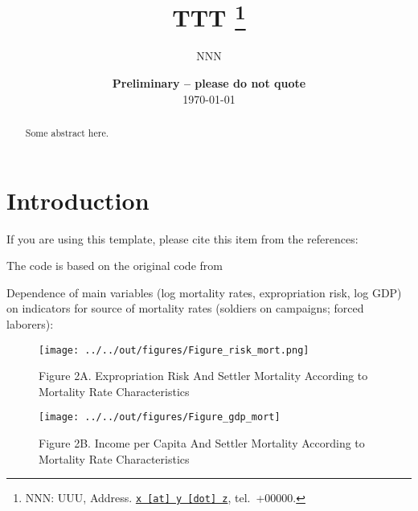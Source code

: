 \documentclass[11pt, a4paper, leqno]{article}
\begin{document}
\title{TTT
\thanks{NNN: UUU, Address. \href{mailto:x@y.z} {\nolinkurl{x [at] y [dot] z}}, tel.~+00000.}
}

\author{NNN
}

\date{
{\bf Preliminary -- please do not quote} 
\\[1ex] 
\today
}

\maketitle

\begin{abstract}
	Some abstract here.
\end{abstract}
\clearpage

\section{Introduction} %
\label{sec:introduction}

If you are using this template, please cite this item from the references: \citet{Gaudecker14}

The code is based on the original code from \citet{Albouy12}

Dependence of main variables (log mortality rates, expropriation risk, log GDP) on indicators for source of mortality rates (soldiers on campaigns; forced laborers):



\clearpage

\begin{figure} 
	\centering   
	\texttt{[image: ../../out/figures/Figure\_risk\_mort.png]}
     \caption*{
     		   Figure 2A. Expropriation Risk And Settler Mortality According to\\ 
     		   Mortality Rate Characteristics
     }
\end{figure}

\begin{figure}[h!]
		\centering
	    \texttt{[image: ../../out/figures/Figure\_gdp\_mort]} 
 	     \caption*{
 	     		   Figure 2B. Income per Capita And Settler Mortality According to\\ 
 	     		   Mortality Rate Characteristics
 	     }
\end{figure}
\end{document}
